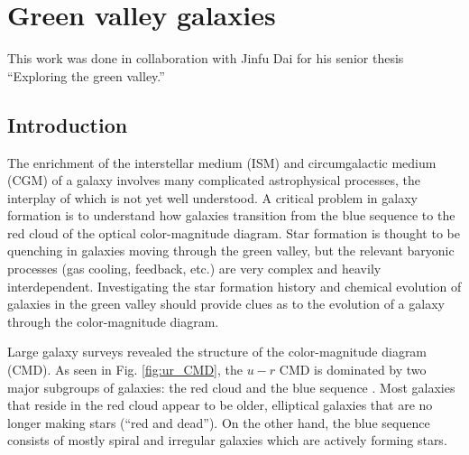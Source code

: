 \chapter[Green valley galaxies]{Green valley galaxies}

This work was done in collaboration with Jinfu Dai for his senior thesis 
``Exploring the green valley.''


\section{Introduction}

The enrichment of the interstellar medium (ISM) and circumgalactic medium (CGM) 
of a galaxy involves many complicated astrophysical processes, the interplay of 
which is not yet well understood.  A critical problem in galaxy formation is to 
understand how galaxies transition from the blue sequence to the red cloud of 
the optical color-magnitude diagram.  Star formation is thought to be quenching 
in galaxies moving through the green valley, but the relevant baryonic processes 
(gas cooling, feedback, etc.) are very complex and heavily interdependent.  
Investigating the star formation history and chemical evolution of galaxies in 
the green valley should provide clues as to the evolution of a galaxy through 
the color-magnitude diagram.



Large galaxy surveys \citep[like the Sloan Digital Sky Survey;][]{York00} 
revealed the structure of the color-magnitude diagram (CMD).  As seen in Fig. 
\ref{fig:ur_CMD}, the $u-r$ CMD is dominated by two major subgroups of galaxies: 
the red cloud and the blue sequence \citep{Strateva01, Baldry04}.  Most galaxies 
that reside in the red cloud appear to be older, elliptical galaxies that are no 
longer making stars (``red and dead'').  On the other hand, the blue sequence 
consists of mostly spiral and irregular galaxies which are actively forming stars.

